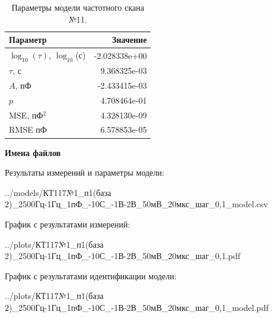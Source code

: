 \begin{table}[!ht]
    \centering
    \caption{Параметры модели частотного скана №11.}
    \begin{tabular}{|l|r|}
        \hline
        Параметр                                       & Значение                  \\ \hline
        $\log_{10}(\tau)$, $\log_{10}$(с)              & -2.028338e+00             \\ \hline
        $\tau$, с                                      & 9.368325e-03              \\ \hline
        $A$, пФ                                        & -2.433415e-03             \\ \hline
        $p$                                            & 4.708464e-01              \\ \hline
        MSE, пФ$^2$                                    & 4.328130e-09              \\ \hline
        RMSE пФ                                        & 6.578853e-05              \\ \hline
    \end{tabular}
    \label{table:frequency_scan_model_11}
\end{table}

\textbf{Имена файлов}

Результаты измерений и параметры модели:

\scriptsize../models/КТ117№1\_п1(база 2)\_2500Гц-1Гц\_1пФ\_-10С\_-1В-2В\_50мВ\_20мкс\_шаг\_0,1\_model.csv
\normalsize

График с результатами измерений:

\scriptsize../plots/КТ117№1\_п1(база 2)\_2500Гц-1Гц\_1пФ\_-10С\_-1В-2В\_50мВ\_20мкс\_шаг\_0,1.pdf
\normalsize

График с результатами идентификации модели:

\scriptsize../plots/КТ117№1\_п1(база 2)\_2500Гц-1Гц\_1пФ\_-10С\_-1В-2В\_50мВ\_20мкс\_шаг\_0,1\_model.pdf
\normalsize

